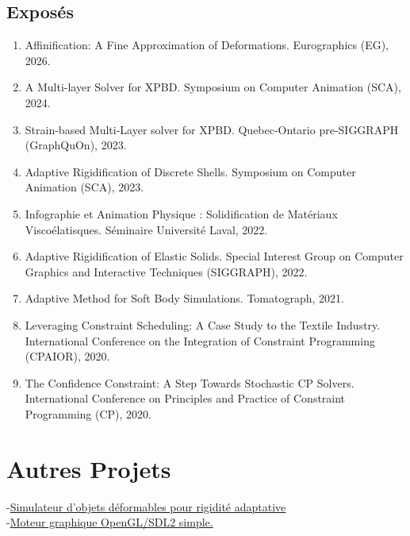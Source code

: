 \documentclass[10pt]{article} %
\begin{document}
\subsection{Exposés}
\begin{enumerate}
  \setcounter{enumi}{\value{listCounter}}
  \item Affinification: A Fine Approximation of Deformations. Eurographics (EG), 2026. 
  \item A Multi-layer Solver for XPBD. Symposium on Computer Animation (SCA), 2024. 
  \item Strain-based Multi-Layer solver for XPBD. Quebec-Ontario pre-SIGGRAPH (GraphQuOn), 2023.
  \item Adaptive Rigidification of Discrete Shells. Symposium on Computer Animation (SCA), 2023. 
  \item Infographie et Animation Physique : Solidification de Matériaux Viscoélatisques.  Séminaire Université Laval, 2022.
  \item Adaptive Rigidification of Elastic Solids. Special Interest Group on Computer Graphics and Interactive Techniques (SIGGRAPH), 2022. 
  \item Adaptive Method for Soft Body Simulations. Tomatograph, 2021.
  \item  Leveraging Constraint Scheduling: A Case Study to the Textile Industry. International Conference on the Integration of Constraint Programming (CPAIOR), 2020.
  \item The Confidence Constraint: A Step Towards Stochastic CP Solvers. International Conference on Principles and Practice of Constraint Programming (CP), 2020.
\end{enumerate}


\section{Autres Projets}

{
-\href{https://github.com/AlexandreMercierAubin/AdaptiveRigidification2022}{Simulateur d'objets déformables pour rigidité adaptative}\\
-\href{https://github.com/AlexandreMercierAubin/ComputerGraphics}{Moteur graphique OpenGL/SDL2 simple.}\\

}
\end{document}
